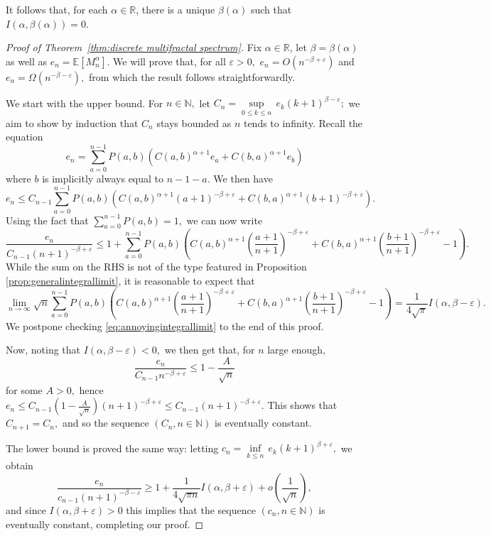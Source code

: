 \documentclass[11pt]{article}
\newcommand{\E}{\mathbb{E}}
\newcommand{\R}{{\mathbb{R}}}
\newcommand{\N}{\mathbb{N}}
\newcommand{\veps}{\varepsilon}
\renewcommand{\geq}{\geqslant}
\renewcommand{\leq}{\leqslant}
\begin{document}
It follows that, for each $\alpha\in\R$, there is a unique $\beta(\alpha)$ such that $I(\alpha,\beta(\alpha))=0$.

\begin{proof}[Proof of Theorem~\ref{thm:discrete multifractal spectrum}]Fix $\alpha\in\R$, let $\beta=\beta(\alpha)$ as well as $e_n=\E[M_n^\alpha]$. We will prove that, for all $\veps>0,$ $e_n=O(n^{-\beta+\veps})$ and $e_n=\Omega(n^{-\beta-\veps}),$ from which the result follows straightforwardly.

We start with the upper bound. For $n\in\N,$ let $C_n=\underset{0\leq k\leq n}\sup \,e_k (k+1)^{\beta-\veps};$ we aim to show by induction that $C_n$ stays bounded as $n$ tends to infinity. Recall the equation
\[e_n=\sum_{a=0}^{n-1}P(a,b)\left(C(a,b)^{\alpha+1}e_a+C(b,a)^{\alpha+1}e_b\right)\]
where $b$ is implicitly always equal to $n-1-a.$ We then have
\[e_n\leq C_{n-1} \sum_{a=0}^{n-1}P(a,b)\left(C(a,b)^{\alpha+1}(a+1)^{-\beta+\veps}+C(b,a)^{\alpha+1}(b+1)^{-\beta+\veps}\right).\]
Using the fact that $\sum_{a=0}^{n-1} P(a,b)=1,$ we can now write
\[\frac{e_n}{C_{n-1}(n+1)^{-\beta+\veps}}\leq 1+ \sum_{a=0}^{n-1}P(a,b)\left(C(a,b)^{\alpha+1}\left(\frac{a+1}{n+1}\right)^{-\beta+\veps}+C(b,a)^{\alpha+1}\left(\frac{b+1}{n+1}\right)^{-\beta+\veps}-1\right).\]
While the sum on the RHS is not of the type featured in Proposition \ref{prop:generalintegrallimit}, it is reasonable to expect that
\begin{equation}\label{eq:annoyingintegrallimit}
    \lim_{n\to\infty} \sqrt{n}\sum_{a=0}^{n-1}P(a,b)\left(C(a,b)^{\alpha+1}\left(\frac{a+1}{n+1}\right)^{-\beta+\veps}+C(b,a)^{\alpha+1}\left(\frac{b+1}{n+1}\right)^{-\beta+\veps}-1\right)=\frac1{4\sqrt{\pi}}I(\alpha,\beta-\veps).
\end{equation}
We postpone checking \eqref{eq:annoyingintegrallimit} to the end of this proof.

Now, noting that $I(\alpha,\beta-\veps)<0,$ we then get that, for $n$ large enough,
\[\frac{e_n}{C_{n-1}n^{-\beta+\veps}}\leq 1-\frac{A}{\sqrt{n}} \]
for some $A>0,$ hence
$e_n\leq C_{n-1}(1-\frac{A}{\sqrt{n}})(n+1)^{-\beta+\veps}\leq C_{n-1}(n+1)^{-\beta+\veps}.$
This shows that $C_{n+1}=C_n,$ and so the sequence $(C_n,n\in\N)$ is eventually constant.

\vspace{0.5cm}

The lower bound is proved the same way: letting $c_n=\underset{k\leq n}\inf \,e_k (k+1)^{\beta+\veps},$ we obtain
\[\frac{e_n}{c_{n-1}(n+1)^{-\beta-\veps}} \geq 1 + \frac1{4\sqrt{\pi n}}I(\alpha,\beta+\veps) + o(\frac1{\sqrt{n}}),\]
and since $I(\alpha,\beta+\veps)>0$ this implies that the sequence $(c_n,n\in\N)$ is eventually constant, completing our proof.


\end{proof}
\end{document}
